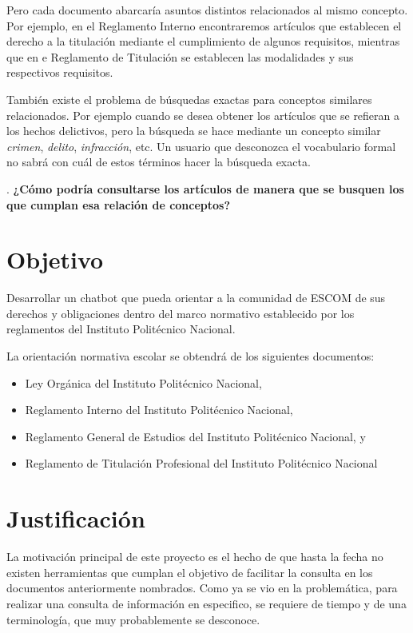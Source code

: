 Pero cada documento abarcaría asuntos distintos relacionados al mismo concepto. Por ejemplo, en el Reglamento Interno encontraremos artículos que establecen el derecho a la titulación mediante el cumplimiento de algunos requisitos, mientras que en e Reglamento de Titulación se establecen las modalidades y sus respectivos requisitos.

También existe el problema de búsquedas exactas para conceptos similares relacionados. Por ejemplo cuando se desea obtener los artículos que se refieran a los hechos delictivos, pero la búsqueda se hace mediante  un concepto similar \textit{crimen}, \textit{delito}, \textit{infracción}, etc. Un usuario que desconozca el vocabulario formal no sabrá con cuál de estos términos hacer la búsqueda exacta.

. \textbf{¿Cómo podría consultarse los artículos de manera que se busquen los que cumplan esa relación de conceptos?}

\section{Objetivo}

Desarrollar un chatbot que pueda orientar a la comunidad de ESCOM de sus derechos y obligaciones dentro
del marco normativo establecido por los reglamentos del Instituto Politécnico Nacional.

La orientación normativa escolar se obtendrá de los siguientes documentos:

\begin{itemize}
    \item Ley Orgánica del Instituto Politécnico Nacional,
    \item Reglamento Interno del Instituto Politécnico Nacional,
    \item Reglamento General de Estudios del Instituto Politécnico Nacional, y
    \item Reglamento de Titulación Profesional del Instituto Politécnico Nacional
\end{itemize}

\section{Justificación}

La motivación principal de este proyecto es el hecho de que hasta la fecha no existen herramientas que cumplan el objetivo de facilitar la consulta en los documentos anteriormente nombrados. Como ya se vio en la problemática, para realizar una consulta de información en especifico, se requiere de tiempo y de una terminología, que muy probablemente se desconoce.

